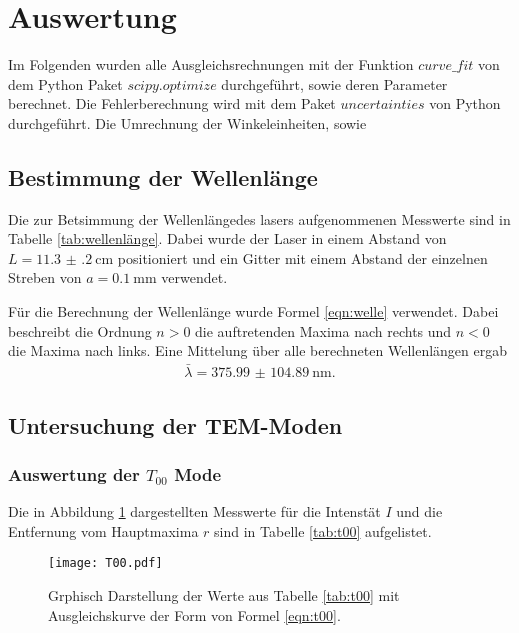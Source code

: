 \newpage
\section{Auswertung}

\label{sec:Auswertung}
Im Folgenden wurden alle Ausgleichsrechnungen mit der Funktion $curve\_fit$ von dem
Python Paket $scipy.optimize$ \cite{scipy} durchgeführt, sowie deren Parameter
berechnet. Die Fehlerberechnung wird mit dem Paket $uncertainties$ \cite{uncertainties}
von Python durchgeführt. Die Umrechnung der Winkeleinheiten, sowie 

\subsection{Bestimmung der Wellenlänge}
Die zur Betsimmung der Wellenlängedes lasers aufgenommenen Messwerte
sind in Tabelle \ref{tab:wellenlänge}. Dabei wurde der Laser in einem Abstand
von $L = \SI{11.3(2)}{\centi\meter}$ positioniert und ein Gitter mit einem Abstand der einzelnen
Streben von $a = \SI{0.1}{\milli\meter}$ verwendet.



Für die Berechnung der Wellenlänge wurde Formel \ref{eqn:welle} verwendet. Dabei
beschreibt die Ordnung $n>0$ die auftretenden Maxima nach rechts und $n<0$ die
Maxima nach links.
Eine Mittelung über alle berechneten Wellenlängen ergab
\begin{align*}
  \bar{\lambda} = \SI{375.99(10489)}{\nano\meter}.
\end{align*}


\subsection{Untersuchung der TEM-Moden}

\subsubsection{Auswertung der $T_{00}$ Mode}
Die in Abbildung \ref{plt:t00} dargestellten Messwerte für die Intenstät $I$
und die Entfernung vom Hauptmaxima $r$ sind in Tabelle \ref{tab:t00}
aufgelistet.


\FloatBarrier

\begin{figure}[htb]
  \centering
  \texttt{[image: T00.pdf]}
  \caption{Grphisch Darstellung der Werte aus Tabelle \ref{tab:t00} mit Ausgleichskurve der Form von Formel \ref{eqn:t00}.}
  \label{plt:t00}
\end{figure}
\FloatBarrier

